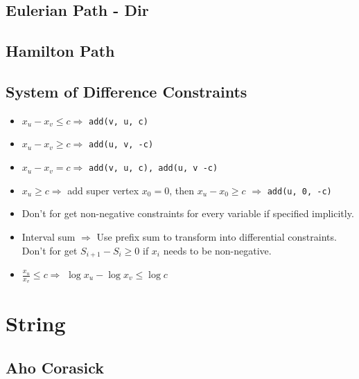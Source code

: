 \documentclass[a4paper,10pt,twocolumn,oneside,x11names]{article}
\begin{document}
\subsection{Eulerian Path - Dir}


\subsection{Hamilton Path}


% 

\subsection{System of Difference Constraints}

\begin{itemize}
	\item $x_u - x_v \le c \Rightarrow$ \texttt{add(v, u, c)}
	\item $x_u - x_v \ge c \Rightarrow$ \texttt{add(u, v, -c)}
	\item $x_u - x_v = c \Rightarrow$ \texttt{add(v, u, c), add(u, v -c)}
	\item $x_u \ge c \Rightarrow$ add super vertex $x_0 = 0$, then $x_u - x_0 \ge c$ $\Rightarrow$ \texttt{add(u, 0, -c)}
	\item Don't for get non-negative constraints for every variable if specified implicitly.
	\item Interval sum $\Rightarrow$ Use prefix sum to transform into differential constraints.  Don't for get $S_{i+1} - S_{i} \ge 0$ if $x_i$ needs to be non-negative.
	\item $\frac{x_u}{x_v} \le c \Rightarrow$ $\log{x_u} - \log{x_v} \le \log{c}$
\end{itemize}


\section{String}

\subsection{Aho Corasick}

\end{document}
